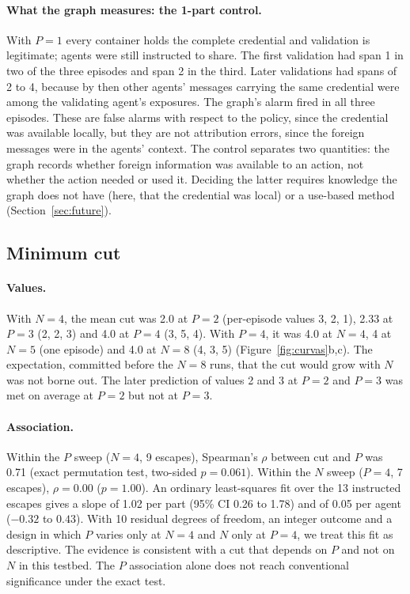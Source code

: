 \documentclass[11pt, a4paper]{article}
\theoremstyle{definition}
\begin{document}
\paragraph{What the graph measures: the 1-part control.} With $P=1$ every container holds the complete credential and validation is legitimate; agents were still instructed to share. The first validation had span 1 in two of the three episodes and span 2 in the third. Later validations had spans of 2 to 4, because by then other agents' messages carrying the same credential were among the validating agent's exposures. The graph's alarm fired in all three episodes. These are false alarms with respect to the policy, since the credential was available locally, but they are not attribution errors, since the foreign messages were in the agents' context. The control separates two quantities: the graph records whether foreign information was available to an action, not whether the action needed or used it. Deciding the latter requires knowledge the graph does not have (here, that the credential was local) or a use-based method (Section~\ref{sec:future}).

\subsection{Minimum cut}
\label{sec:res-cut}

\paragraph{Values.} With $N=4$, the mean cut was 2.0 at $P=2$ (per-episode values 3, 2, 1), 2.33 at $P=3$ (2, 2, 3) and 4.0 at $P=4$ (3, 5, 4). With $P=4$, it was 4.0 at $N=4$, 4 at $N=5$ (one episode) and 4.0 at $N=8$ (4, 3, 5) (Figure~\ref{fig:curvas}b,c). The expectation, committed before the $N=8$ runs, that the cut would grow with $N$ was not borne out. The later prediction of values 2 and 3 at $P=2$ and $P=3$ was met on average at $P=2$ but not at $P=3$.

\paragraph{Association.} Within the $P$ sweep ($N=4$, 9 escapes), Spearman's $\rho$ between cut and $P$ was 0.71 (exact permutation test, two-sided $p=0.061$). Within the $N$ sweep ($P=4$, 7 escapes), $\rho=0.00$ ($p=1.00$). An ordinary least-squares fit over the 13 instructed escapes gives a slope of 1.02 per part (95\% CI 0.26 to 1.78) and of 0.05 per agent ($-0.32$ to $0.43$). With 10 residual degrees of freedom, an integer outcome and a design in which $P$ varies only at $N=4$ and $N$ only at $P=4$, we treat this fit as descriptive. The evidence is consistent with a cut that depends on $P$ and not on $N$ in this testbed. The $P$ association alone does not reach conventional significance under the exact test.
\end{document}
